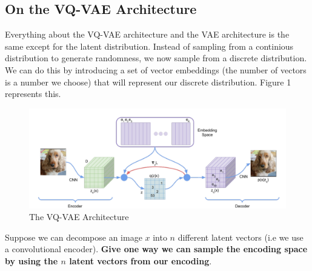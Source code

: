 \documentclass{article}
\begin{document}
\subsection{On the VQ-VAE Architecture}
Everything about the VQ-VAE architecture and the VAE architecture is the same except for the latent distribution. Instead of sampling from a continious distribution to generate randomness, we now sample from a discrete distribution. We can do this by introducing a set of vector embeddings (the number of vectors is a number we choose) that will represent our discrete distribution. Figure 1 represents this.
\begin{figure}[h]
    \centering
    \includegraphics[width=1.0\textwidth]{image.png}
    \caption{The VQ-VAE Architecture}
    \label{fig:mesh1}
\end{figure}
\newline
Suppose we can decompose an image $x$ into $n$ different latent vectors (i.e we use a convolutional encoder). \textbf{Give one way we can sample the encoding space by using the $n$ latent vectors from our encoding}.
\newpage
\end{document}
